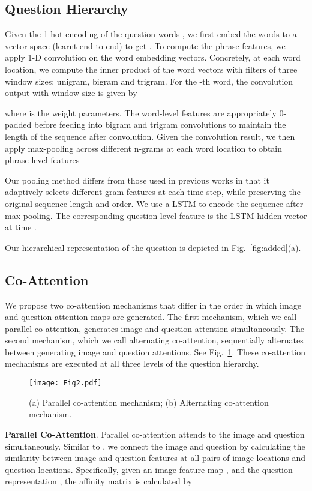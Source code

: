 \documentclass{article}
\begin{document}
\subsection{Question Hierarchy}
\label{subsec:hierarchy}
Given the 1-hot encoding of the question words , we first embed the words to a vector space (learnt end-to-end) to get  . To compute the phrase features, we apply 1-D convolution on the word embedding vectors. Concretely, at each word location, we compute the inner product of the word vectors with filters of three window sizes: unigram, bigram and trigram. For the -th word, the convolution output with window size  is given by

where  is the weight parameters. The word-level features   are appropriately 0-padded before feeding into bigram and trigram convolutions to maintain the length of the sequence after convolution. Given the convolution result, we then apply max-pooling across different n-grams at each word location to obtain phrase-level features


Our pooling method differs from those used in previous works \cite{hu2014convolutional} in that it adaptively selects different gram features at each time step, while preserving the original sequence length and order.
We use a LSTM to encode the sequence  after max-pooling. The corresponding question-level feature  is the LSTM hidden vector at time . 

Our hierarchical representation of the question is depicted in Fig.~\ref{fig:added}(a).
\subsection{Co-Attention}
\label{subsec:co-attention}
We propose two co-attention mechanisms that differ in the order in which image and question attention maps are generated. The first mechanism, which we call parallel co-attention, generates image and question attention simultaneously. The second mechanism, which we call alternating co-attention, sequentially alternates between generating image and question attentions. See Fig.~\ref{fig:model}. These co-attention mechanisms are executed at all three levels of the question hierarchy.
\begin{figure}[t]
 \centering 
 \texttt{[image: Fig2.pdf]}
 \caption{(a) Parallel co-attention mechanism; (b) Alternating co-attention mechanism.}
 \label{fig:model}
\end{figure}

\textbf{Parallel Co-Attention}. Parallel co-attention attends to the image and question simultaneously. Similar to \cite{xu2015ask}, we connect the image and question by calculating the similarity between image and question features at all pairs of image-locations and question-locations. Specifically, given an image feature map , and the question representation , the affinity matrix  is calculated by
\end{document}
